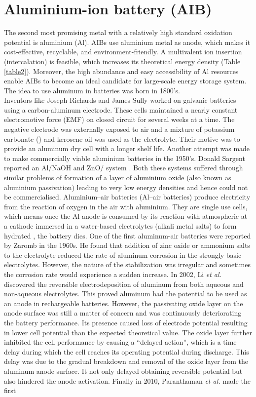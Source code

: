 \section{Aluminium-ion battery (AIB)}
The second most promising metal with a relatively high standard oxidation potential is aluminium (Al). AIBs use aluminium metal as anode, which makes it cost-effective, recyclable, and environment-friendly. A multivalent ion insertion (intercalation) is feasible, which increases its theoretical energy density (Table \ref{table2}). Moreover, the high abundance and easy accessibility of Al resources enable AIBs to become an ideal candidate for large-scale energy storage system. 
The idea to use aluminum in batteries was born in 1800's.\\ Inventors like Joseph Richards and James Sully worked on galvanic batteries using a carbon-aluminum electrode. These cells maintained a nearly constant electromotive force (EMF) on closed circuit for several weeks at a time. The negative electrode was externally exposed to air and a mixture of potassium carbonate () and kerosene oil was used as the electrolyte. Their motive was to provide an aluminum dry cell with a longer shelf life. Another attempt was made to make commercially viable aluminium batteries in the 1950's. Donald Sargent reported an Al/NaOH and ZnO/ system . Both these systems suffered through similar problems of formation of a layer of aluminium oxide (also known as aluminium passivation) leading to very low energy densities and hence could not be commercialised. Aluminium–air batteries (Al–air batteries) produce electricity from the reaction of oxygen in the air with aluminium. They are single use cells, which means once the Al anode is consumed by its reaction with atmospheric  at a cathode immersed in a water-based electrolytes (alkali metal salts) to form hydrated , the battery dies. One of the first aluminum-air batteries were reported by Zaromb\cite{zaromb_use_1962} in the 1960s. He found that addition of zinc oxide or ammonium salts to the electrolyte reduced the rate of aluminum corrosion in the strongly basic electrolytes. However, the nature of the stabilization was irregular and sometimes the corrosion rate would experience a sudden increase\cite{bockstie_control_1963}. In 2002, Li \textit{et al.} discovered the reversible electrodeposition of aluminum from both aqueous and non-aqueous electrolytes\cite{li_aluminum_2002}. This proved aluminum had the potential to be used as an anode in rechargeable batteries. However, the passivating oxide layer on the anode surface was still a matter of concern and was continuously deteriorating the battery performance. Its presence caused loss of electrode potential resulting in lower cell potential than the expected theoretical value. The oxide layer further inhibited the cell performance by causing a \enquote{delayed action}, which is a time delay during which the cell reaches its operating potential during discharge. This delay was due to the gradual breakdown and removal of the oxide layer from the aluminum anode surface. It not only delayed obtaining reversible potential but also hindered the anode activation. Finally in 2010, Paranthaman \textit{et al.} made the first 